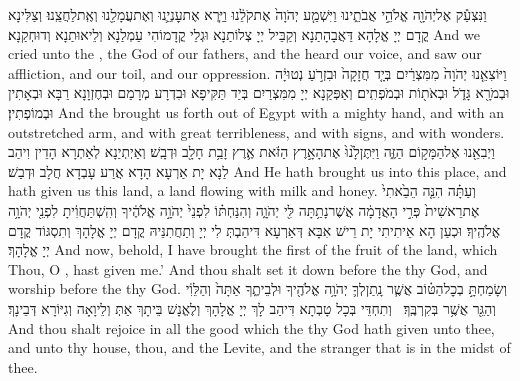 {וַנִּצְעַ֕ק אֶל\maqqaf יְהֹוָ֖ה אֱלֹהֵ֣י אֲבֹתֵ֑ינוּ וַיִּשְׁמַ֤ע יְהֹוָה֙ אֶת\maqqaf קֹלֵ֔נוּ וַיַּ֧רְא אֶת\maqqaf עׇנְיֵ֛נוּ וְאֶת\maqqaf עֲמָלֵ֖נוּ וְאֶֽת\maqqaf לַחֲצֵֽנוּ׃}
{וְצַלִּינָא קֳדָם יְיָ אֱלָהָא דַּאֲבָהָתַנָא וְקַבֵּיל יְיָ צְלוֹתַנָא וּגְלֵי קֳדָמוֹהִי עַמְלַנָא וְלֵיאוּתַנָא וְדוּחְקַנָא׃}
{And we cried unto the \lord, the God of our fathers, and the \lord\space heard our voice, and saw our affliction, and our toil, and our oppression.}{}
{וַיּוֹצִאֵ֤נוּ יְהֹוָה֙ מִמִּצְרַ֔יִם בְּיָ֤ד חֲזָקָה֙ וּבִזְרֹ֣עַ נְטוּיָ֔ה וּבְמֹרָ֖א גָּדֹ֑ל וּבְאֹת֖וֹת וּבְמֹפְתִֽים׃}
{וְאַפְּקַנָא יְיָ מִמִּצְרַיִם בְּיַד תַּקִּיפָא וּבִדְרָע מְרָמַם וּבְחֶזְוָנָא רַבָּא וּבְאָתִין וּבְמוֹפְתִין׃}
{And the \lord\space brought us forth out of Egypt with a mighty hand, and with an outstretched arm, and with great terribleness, and with signs, and with wonders.}{}
{וַיְבִאֵ֖נוּ אֶל\maqqaf הַמָּק֣וֹם הַזֶּ֑ה וַיִּתֶּן\maqqaf לָ֙נוּ֙ אֶת\maqqaf הָאָ֣רֶץ הַזֹּ֔את אֶ֛רֶץ זָבַ֥ת חָלָ֖ב וּדְבָֽשׁ׃}
{וְאַיְתְיַנָא לְאַתְרָא הָדֵין וִיהַב לַנָא יָת אַרְעָא הָדָא אֲרַע עָבְדָא חֲלָב וּדְבַשׁ׃}
{And He hath brought us into this place, and hath given us this land, a land flowing with milk and honey.}{}
{וְעַתָּ֗ה הִנֵּ֤ה הֵבֵ֙אתִי֙ אֶת\maqqaf רֵאשִׁית֙ פְּרִ֣י הָאֲדָמָ֔ה אֲשֶׁר\maqqaf נָתַ֥תָּה לִּ֖י יְהֹוָ֑ה וְהִנַּחְתּ֗וֹ לִפְנֵי֙ יְהֹוָ֣ה אֱלֹהֶ֔יךָ וְהִֽשְׁתַּחֲוִ֔יתָ לִפְנֵ֖י יְהֹוָ֥ה אֱלֹהֶֽיךָ׃}
{וּכְעַן הָא אֵיתִיתִי יָת רֵישׁ אִבָּא דְּאַרְעָא דִּיהַבְתְּ לִי יְיָ וְתַחֲתִנֵּיהּ קֳדָם יְיָ אֱלָהָךְ וְתִסְגּוֹד קֳדָם יְיָ אֱלָהָךְ׃}
{And now, behold, I have brought the first of the fruit of the land, which Thou, O \lord, hast given me.’ And thou shalt set it down before the \lord\space thy God, and worship before the \lord\space thy God.}{}
{וְשָׂמַחְתָּ֣ בְכׇל\maqqaf הַטּ֗וֹב אֲשֶׁ֧ר נָֽתַן\maqqaf לְךָ֛ יְהֹוָ֥ה אֱלֹהֶ֖יךָ וּלְבֵיתֶ֑ךָ אַתָּה֙ וְהַלֵּוִ֔י וְהַגֵּ֖ר אֲשֶׁ֥ר בְּקִרְבֶּֽךָ׃ \setuma }
{וְתִחְדֵּי בְּכָל טָבְתָא דִּיהַב לָךְ יְיָ אֱלָהָךְ וְלֶאֱנָשׁ בֵּיתָךְ אַתְּ וְלֵיוָאָה וְגִיּוֹרָא דְּבֵינָךְ׃}
{And thou shalt rejoice in all the good which the \lord\space thy God hath given unto thee, and unto thy house, thou, and the Levite, and the stranger that is in the midst of thee.}{}
